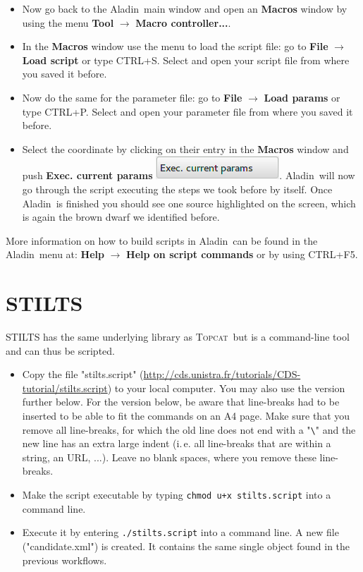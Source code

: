\documentclass [a4paper, 12pt]{article}
\newcommand{\aladin}{{\textsc{A}{ladin}}}
\newcommand{\topcat}{{\textsc{Topcat}}}
\begin{document}
\begin{itemize}
\item Now go back to the \aladin\ main window and open an \textbf{Macros} 
window by using the menu \textbf{Tool} $\rightarrow$ \textbf{Macro 
controller...}. 
\item In the \textbf{Macros} window use the menu to load the script file: go to 
\textbf{File} $\rightarrow$ \textbf{Load script} or type CTRL+S. Select and 
open your script file from where you saved it before. 
\item Now do the same for the parameter file: go to 
\textbf{File} $\rightarrow$ \textbf{Load params} or type CTRL+P. Select and 
open your parameter file from where you saved it before. 
\item Select the coordinate by clicking on their entry in the \textbf{Macros} 
window and push \textbf{Exec. current params} 
\includegraphics[width=0.15        
\textwidth]{../images/aladin_macros_execcurrent.png}. \aladin\ will now go 
through the script executing the steps we took before by itself. Once \aladin\ 
is finished you should see one source highlighted on the screen, which is again 
the brown dwarf we identified before. 
\end{itemize}
More information on how to build scripts in \aladin\ can be found in the 
\aladin\ menu at: \textbf{Help} $\rightarrow$ \textbf{Help on script commands} 
or by using CTRL+F5. 

\section{STILTS}
STILTS has the same underlying library as \topcat\ but is a command-line tool 
and can thus be scripted. 
\begin{itemize}
    \item Copy the file "stilts.script" 
    (\url{http://cds.unistra.fr/tutorials/CDS-tutorial/stilts.script}) to your 
    local computer. You may also use the version further below. For the version 
    below, be aware that line-breaks had to be inserted to be able to fit the 
    commands on an A4 page. Make sure that you remove all line-breaks, for 
    which the old line does not end with a "\verb|\|" and the new line has an 
    extra large indent (i.\,e. all line-breaks that are within a string, an 
    URL, ...). 
    Leave no blank spaces, where you remove these line-breaks.
    \item Make the script executable by typing \texttt{chmod u+x stilts.script} 
    into a command line.
    \item Execute it by entering \texttt{./stilts.script} into a command 
    line. A new file ("candidate.xml") is created. It contains the same single 
    object found in the previous workflows.
\end{itemize}
\end{document}
